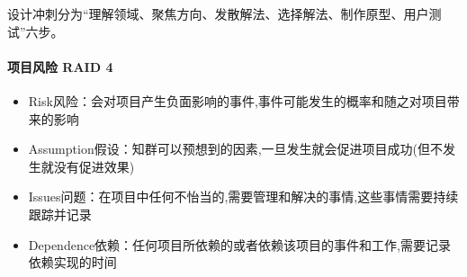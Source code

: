 \documentclass[letterpaper,10pt,english]{sphinxmanual}
\begin{document}
设计冲刺分为“理解领域、聚焦方向、发散解法、选择解法、制作原型、用户测试”六步。


\paragraph{项目风险 RAID 4\sphinxfootnotemark[489]}
\label{\detokenize{chapter_knowledge/BRD:raid-4}}%
\begin{footnotetext}[489]\sphinxAtStartFootnote
{}
%
\end{footnotetext}\ignorespaces \begin{itemize}
\item {} 
Risk风险：会对项目产生负面影响的事件,事件可能发生的概率和随之对项目带来的影响

\item {} 
Assumption假设：知群可以预想到的因素,一旦发生就会促进项目成功(但不发生就没有促进效果)

\item {} 
Issues问题：在项目中任何不怡当的,需要管理和解决的事情,这些事情需要持续跟踪并记录

\item {} 
Dependence依赖：任何项目所依赖的或者依赖该项目的事件和工作,需要记录依赖实现的时间

\end{itemize}
\end{document}
